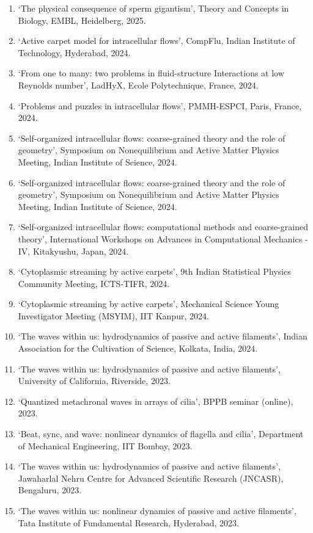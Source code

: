 \documentclass[10pt]{res} %
\begin{document}
\begin{resume}
\begin{enumerate}
	\vspace*{5mm}
	\item `The physical consequence of sperm gigantism', Theory and Concepts in Biology, EMBL, Heidelberg, 2025.
	\item `Active carpet model for intracellular flows', CompFlu, Indian Institute of Technology, Hyderabad, 2024.
	\item `From one to many: two problems in fluid-structure Interactions at low Reynolds number', LadHyX, Ecole Polytechnique, France, 2024. 
	\item `Problems and puzzles in intracellular flows', PMMH-ESPCI, Paris, France, 2024.
	\item `Self-organized intracellular flows: coarse-grained theory and the role of geometry', Symposium on Nonequilibrium and Active Matter Physics Meeting, Indian Institute of Science, 2024.
	\item `Self-organized intracellular flows: coarse-grained theory and the role of geometry', Symposium on Nonequilibrium and Active Matter Physics Meeting, Indian Institute of Science, 2024.
	\item `Self-organized intracellular flows: computational methods and coarse-grained theory', International Workshops on Advances in Computational Mechanics - IV, Kitakyushu, Japan, 2024.
	\item `Cytoplasmic streaming by active carpets', 9th Indian Statistical Physics Community Meeting, ICTS-TIFR, 2024.
	\item `Cytoplasmic streaming by active carpets', Mechanical Science Young Investigator Meeting (MSYIM), IIT Kanpur, 2024.
	\item `The waves within us: hydrodynamics of passive and active filaments', Indian Association for the Cultivation of Science, Kolkata, India, 2024.
	\item `The waves within us: hydrodynamics of passive and active filaments', University of California, Riverside, 2023.
	\item `Quantized metachronal waves in arrays of cilia', BPPB seminar (online), 2023.
	\item `Beat, sync, and wave: nonlinear dynamics of flagella and cilia', Department of Mechanical Engineering, IIT Bombay, 2023.
	\item `The waves within us: hydrodynamics of passive and active filaments', Jawaharlal Nehru Centre for Advanced Scientific Research (JNCASR), Bengaluru, 2023.
	\item `The waves within us: nonlinear dynamics of passive and active filaments', Tata Institute of Fundamental Research, Hyderabad, 2023.

\end{enumerate}
\end{resume}
\end{document}
